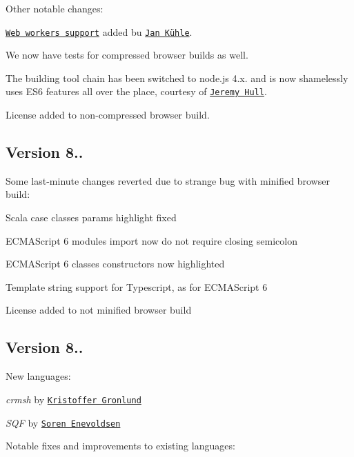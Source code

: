 Other notable changes\+:


\begin{DoxyItemize}
\item \href{https://github.com/isagalaev/highlight.js#web-workers}{\tt Web workers support} added bu \href{https://github.com/frigus02}{\tt Jan Kühle}.
\item We now have tests for compressed browser builds as well.
\item The building tool chain has been switched to node.\+js 4.\+x. and is now shamelessly uses E\+S6 features all over the place, courtesy of \href{https://github.com/sourrust}{\tt Jeremy Hull}.
\item License added to non-\/compressed browser build.
\end{DoxyItemize}

\subsection*{Version 8..}

Some last-\/minute changes reverted due to strange bug with minified browser build\+:


\begin{DoxyItemize}
\item Scala case classes params highlight fixed
\item E\+C\+M\+A\+Script 6 modules import now do not require closing semicolon
\item E\+C\+M\+A\+Script 6 classes constructors now highlighted
\item Template string support for Typescript, as for E\+C\+M\+A\+Script 6
\item License added to not minified browser build
\end{DoxyItemize}

\subsection*{Version 8..}

New languages\+:


\begin{DoxyItemize}
\item {\itshape crmsh} by \href{https://github.com/krig}{\tt Kristoffer Gronlund}
\item {\itshape S\+QF} by \href{https://github.com/senevoldsen90}{\tt Soren Enevoldsen}
\end{DoxyItemize}

Notable fixes and improvements to existing languages\+:


